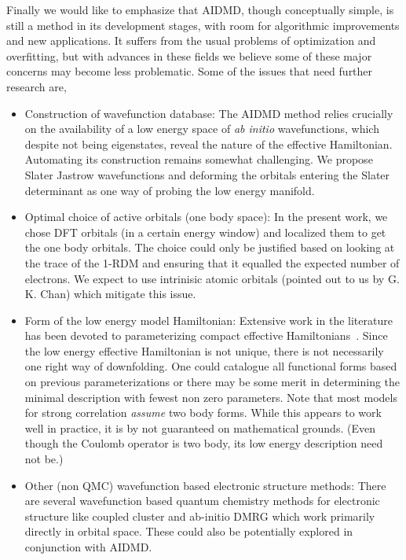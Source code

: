 Finally we would like to emphasize that AIDMD, though conceptually simple, 
is still a method in its development stages, with room for algorithmic improvements and new applications. It suffers 
from the usual problems of optimization and overfitting, but with advances in these fields we believe some of these major 
concerns may become less problematic. Some of the issues that need further research are,
\begin{itemize} 
	\item Construction of wavefunction database:
	The AIDMD method relies crucially on the availability of a low energy space of \emph{ab initio} wavefunctions, 
	which despite not being eigenstates, reveal the nature of the effective Hamiltonian. Automating its construction 
	remains somewhat challenging. We propose Slater Jastrow wavefunctions and deforming the orbitals entering the Slater 
	determinant as one way of probing the low energy manifold.
	\item Optimal choice of active orbitals (one body space):
	In the present work, we chose DFT orbitals (in a certain energy window) and localized them to get the one body orbitals. 
	The choice could only be justified based on looking at the trace of the 1-RDM and ensuring that it 
	equalled the expected number of electrons. We expect to use intrinisic atomic orbitals (pointed out to us by G. K. Chan) which 
	mitigate this issue. 
	\item Form of the low energy model Hamiltonian:
	Extensive work in the literature has been devoted to parameterizing compact effective Hamiltonians~\cite{Georges, Oles, Coury}. 
	Since the low energy effective Hamiltonian is not unique, there is not necessarily one right way of downfolding. 
	One could catalogue all functional forms based on previous parameterizations 
	or there may be some merit in determining the minimal description with fewest non zero parameters.
	Note that most models for strong correlation \emph{assume} two body forms. While this appears to work well in practice, 
	it is by not guaranteed on mathematical grounds. (Even though the Coulomb operator is two body, 
	its low energy description need not be.)
	\item Other (non QMC) wavefunction based electronic structure methods:
	There are several wavefunction based quantum chemistry 
	methods for electronic structure like coupled cluster and ab-initio DMRG which work primarily 
	directly in orbital space. These could also be potentially explored in conjunction with AIDMD.
\end{itemize} 

